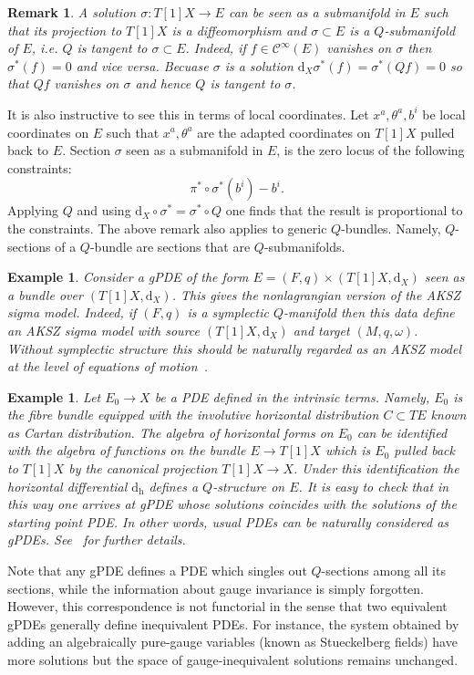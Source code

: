 \documentclass[a4paper,12pt]{article}
\numberwithin{equation}{section} %
\newtheorem{rem}[thm]{Remark}
\newtheorem{example}[thm]{Example}
\newcommand{\dx}{\mathrm{d}_X}
\renewcommand{\dh}{\mathrm{d_h}}
\newcommand{\cC}{\mathcal{C}}
\begin{document}
\begin{rem}\label{sol-subman} 
    A solution $\sigma:T[1]X \to E$ can be seen as a submanifold in $E$ such that its projection to $T[1]X$ is a diffeomorphism and $\sigma\subset E$ is a $Q$-submanifold of $E$, i.e. $Q$ is tangent to $\sigma\subset E$. Indeed, if $f\in \cC^\infty(E)$ vanishes on $\sigma$ then  $\sigma^*(f)=0$ and vice versa. Becuase $\sigma$ is a solution $\dx \sigma^*(f)=\sigma^* (Qf)=0$ so that $Qf$ vanishes on $\sigma$ and hence $Q$ is tangent to $\sigma$.
\end{rem}
It is also instructive to see this in terms of local coordinates. Let $x^a,\theta^a,b^i$ be local coordinates on $E$ such that $x^a,\theta^a$ are the adapted coordinates on $T[1]X$ pulled back to $E$. Section $\sigma$ seen as a submanifold in $E$, is the zero locus of the following constraints:
\begin{equation}
    \pi^* \circ \sigma^* (b^i)
 - b^i.
\end{equation}
Applying $Q$ and using $\dx \circ \sigma^*=\sigma^*\circ Q$ one finds that the result is proportional to the constraints. The above remark also applies to generic $Q$-bundles. Namely, $Q$-sections of a  $Q$-bundle  are sections that are $Q$-submanifolds.

\begin{example}
Consider a gPDE of the form $E=(F,q)\times (T[1]X,\dx)$ seen as a bundle over $(T[1]X,\dx)$. This  gives the nonlagrangian version of the AKSZ sigma model. Indeed, if $(F,q)$ is a symplectic $Q$-manifold then this data define an AKSZ sigma model with source $(T[1]X,\dx)$ and target $(M,q,\omega)$. Without symplectic structure this should be naturally regarded as an AKSZ model at the level of equations of motion~\cite{Barnich:2006hbb}.
\end{example}
\begin{example}
Let $E_0\to X$ be a PDE defined in the intrinsic terms. Namely, $E_0$ is the fibre bundle equipped with the involutive horizontal distribution $C\subset TE$ known as Cartan distribution. The algebra of horizontal forms on $E_0$ can be identified with the algebra of functions on the bundle $E\to T[1]X$ which is $E_0$ pulled back to $T[1]X$ by the canonical projection $T[1]X\to X$. Under this identification the horizontal differential $\dh$ defines a $Q$-structure on $E$. It is easy to check that in this way one arrives at gPDE whose solutions coincides with the solutions of the starting point PDE. In other words, usual PDEs can be naturally considered as gPDEs. See~\cite{Grigoriev:2019ojp} for further details.
\end{example}
Note that any gPDE defines a PDE which singles out $Q$-sections among all its sections, while the information about gauge invariance is simply forgotten. However, this correspondence is not functorial in the sense that two equivalent gPDEs generally define inequivalent PDEs. For instance, the system obtained by adding an algebraically pure-gauge variables (known as Stueckelberg fields) have more solutions but the space of gauge-inequivalent solutions remains unchanged.
\end{document}

